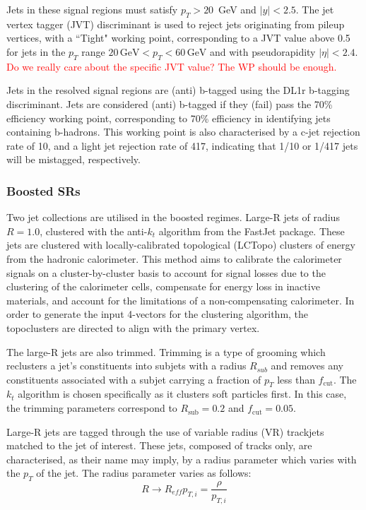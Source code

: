 \documentclass[10pt,a4paper]{book}
\newcommand{\todo}[1]{{\textcolor{red}{#1}}}
\begin{document}
Jets in these signal regions must satisfy $p_T > 20$~GeV and $\vert y \vert < 2.5$. The jet vertex tagger (JVT) discriminant is used to reject jets originating from pileup vertices, with a ``Tight" working point, corresponding to a JVT value above 0.5 for jets in the $p_T$ range $20 \, \text{GeV} < p_T < 60 \, \text{GeV}$ and with pseudorapidity $\vert \eta \vert < 2.4$. \todo{Do we really care about the specific JVT value? The WP should be enough.}

Jets in the resolved signal regions are (anti) b-tagged using the DL1r  b-tagging discriminant. Jets are considered (anti) b-tagged if they (fail) pass the 70\% efficiency working point, corresponding to 70\% efficiency in identifying jets containing b-hadrons. This working point is also characterised by a c-jet rejection rate of 10, and a light jet rejection rate of 417, indicating that 1/10 or 1/417 jets will be mistagged, respectively. 

\subsubsection{Boosted SRs}

Two jet collections are utilised in the boosted regimes. Large-R jets of radius $R = 1.0$, clustered with the anti-$k_t$ algorithm from the FastJet package. These jets are clustered with locally-calibrated topological (LCTopo) clusters of energy from the hadronic calorimeter.  This method aims to calibrate the calorimeter signals on a cluster-by-cluster basis to account for signal losses due to the clustering of the calorimeter cells, compensate for energy loss in inactive materials, and account for the limitations of a non-compensating calorimeter. In order to generate the input 4-vectors for the clustering algorithm, the topoclusters are directed to align with the primary vertex.

The large-R jets are also trimmed. Trimming is a type of grooming which reclusters a jet's constituents into subjets with a radius $R_{sub}$ and removes any constituents associated with a subjet carrying a fraction of $p_T$ less than $f_\mathrm{cut}$. The $k_t$ algorithm is chosen specifically as it clusters soft particles first. In this case, the trimming parameters correspond to $R_{\mathrm{sub}} = 0.2$ and $f_{\mathrm{cut}} = 0.05$. 

Large-R jets are tagged through the use of variable radius (VR) trackjets matched to the jet of interest. These jets, composed of tracks only, are characterised, as their name may imply, by a radius parameter which varies with the $p_T$ of the jet. The radius parameter varies as follows:
\begin{equation}
R \rightarrow R_{eff}{p_{T,i}} = \frac{\rho}{p_{T,i}}
\label{Reff}
\end{equation} 
\end{document}
